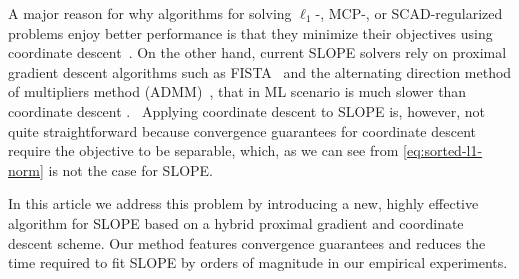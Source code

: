 A major reason for why algorithms for solving $\ell_1$-, MCP-, or SCAD-regularized problems enjoy better
performance is that they minimize their objectives using coordinate
descent~\cite{breheny2011, friedman2010}.
On the other hand, current SLOPE solvers rely on proximal gradient descent
algorithms such as FISTA~\cite{beck2009} and the
alternating direction method of multipliers method (ADMM)~\cite{boyd2010}, that in ML scenario is much slower than coordinate descent \cite{moreau2022benchopt}.
\
Applying coordinate descent to SLOPE is, however, not quite straightforward
because convergence guarantees for coordinate descent require the
objective to be separable, which, as we can see from \eqref{eq:sorted-l1-norm}
is not the case for SLOPE.


In this article we address this problem by introducing a new, highly effective
algorithm for SLOPE based on a hybrid proximal gradient and coordinate descent
scheme. Our method features convergence guarantees and reduces the time
required to fit SLOPE by orders of magnitude in our empirical experiments.
